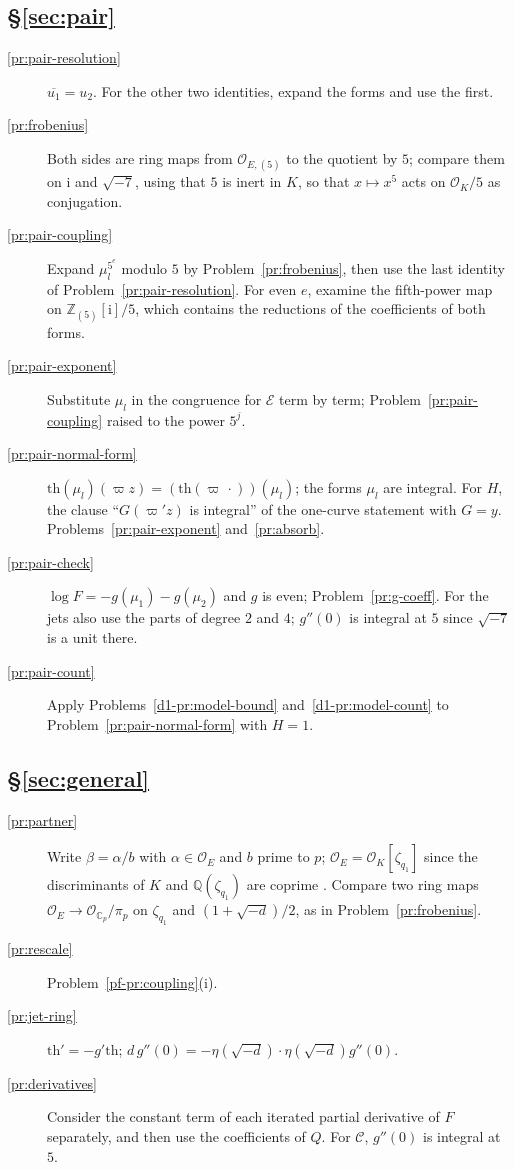 \documentclass[reqno]{amsart}
\theoremstyle{plain}
\theoremstyle{definition}
\theoremstyle{remark}
\newcommand{\Z}{\mathbb{Z}}
\newcommand{\Q}{\mathbb{Q}}
\newcommand{\C}{\mathbb{C}}
\newcommand{\Oc}{\mathcal{O}}
\newcommand{\Op}{\mathcal{O}_{\C_p}}
\newcommand{\Ec}{\mathcal{E}}
\newcommand{\tth}{\mathrm{th}}
\newcommand{\ii}{\mathrm{i}}
\begin{document}
\subsection*{\S\ref{sec:pair}}
\begin{description}
\item[\ref{pr:pair-resolution}] \(\overline{u_1} = u_2\).  For the other two identities, expand the forms and use the first.
\item[\ref{pr:frobenius}] Both sides are ring maps from \(\Oc_{E,(5)}\) to the quotient by \(5\); compare them on \(\ii\) and \(\sqrt{-7}\), using that \(5\) is inert in \(K\), so that \(x \mapsto x^5\) acts on \(\Oc_K/5\) as conjugation.
\item[\ref{pr:pair-coupling}] Expand \(\mu_l^{5^e}\) modulo \(5\) by Problem~\ref{pr:frobenius}, then use the last identity of Problem~\ref{pr:pair-resolution}.  For even \(e\), examine the fifth-power map on \(\Z_{(5)}[\ii]/5\), which contains the reductions of the coefficients of both forms.
\item[\ref{pr:pair-exponent}] Substitute \(\mu_l\) in the congruence for \(\Ec\) term by term; Problem~\ref{pr:pair-coupling} raised to the power \(5^j\).
\item[\ref{pr:pair-normal-form}] \(\tth(\mu_l)(\varpi z) = (\tth(\varpi\,\cdot))(\mu_l)\); the forms \(\mu_l\) are integral.  For \(H\), the clause ``\(G(\varpi' z)\) is integral'' of the one-curve statement with \(G = y\).  Problems~\ref{pr:pair-exponent} and~\ref{pr:absorb}.
\item[\ref{pr:pair-check}] \(\log F = -g(\mu_1) - g(\mu_2)\) and \(g\) is even; Problem~\ref{pr:g-coeff}.  For the jets also use the parts of degree \(2\) and \(4\); \(g''(0)\) is integral at \(5\) since \(\sqrt{-7}\) is a unit there.
\item[\ref{pr:pair-count}] Apply Problems~\ref{d1-pr:model-bound} and~\ref{d1-pr:model-count} to Problem~\ref{pr:pair-normal-form} with \(H = 1\).
\end{description}

\subsection*{\S\ref{sec:general}}
\begin{description}
\item[\ref{pr:partner}] Write \(\beta = \alpha/b\) with \(\alpha \in \Oc_E\) and \(b\) prime to \(p\); \(\Oc_E = \Oc_K[\zeta_{q_1}]\) since the discriminants of \(K\) and \(\Q(\zeta_{q_1})\) are coprime \cite[Prop.~I.2.11]{Ne}.  Compare two ring maps \(\Oc_E \to \Op/\pi_p\) on \(\zeta_{q_1}\) and \((1+\sqrt{-d})/2\), as in Problem~\ref{pr:frobenius}.
\item[\ref{pr:rescale}] Problem~\ref{pf-pr:coupling}(i).
\item[\ref{pr:jet-ring}] \(\tth' = -g'\tth\); \(d\,g''(0) = -\eta(\sqrt{-d}) \cdot \eta(\sqrt{-d})g''(0)\).
\item[\ref{pr:derivatives}] Consider the constant term of each iterated partial derivative of \(F\) separately, and then use the coefficients of \(Q\).  For \(\mathcal C\), \(g''(0)\) is integral at \(5\).
\end{description}
\end{document}
